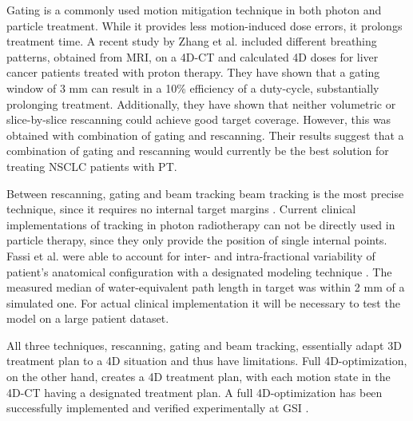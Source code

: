 \documentclass[type=dr, dr=rernat, accentcolor=tud7b,colorbacktitle, bigchapter, openright, twoside, 12pt ]{tudthesis}
\begin{document}

Gating is a commonly used motion mitigation technique in both photon and particle treatment. While it provides less motion-induced dose errors, it prolongs treatment time.
A recent study by Zhang et al. \cite{Zhang2015} included 
different breathing patterns, obtained from MRI, on a 4D-CT and calculated 4D doses for liver cancer patients treated with proton therapy. They have shown that a gating window of 3 mm can result
in a 10\% efficiency of a duty-cycle, 
substantially prolonging treatment. Additionally, they have shown that neither volumetric or slice-by-slice rescanning could achieve good target coverage.
However, this was obtained with combination
of gating and rescanning. Their results suggest that a combination of gating and rescanning would currently be the best solution for treating NSCLC patients with PT.

Between rescanning, gating and beam tracking beam tracking is the most precise technique, since it requires no internal target margins \cite{Bert2011}. 
Current clinical implementations of tracking in photon radiotherapy \cite{Kilby2010, Keall2014} can not be directly used in particle therapy, 
since they only provide the position of single internal points. Fassi et al. 
\cite{Fassi2015} were able to account for inter- and intra-fractional variability of patient's anatomical configuration with a designated modeling technique \cite{Fassi2014}.
The measured median of water-equivalent path length in target was within 2 mm of a simulated one. For actual clinical implementation it will be necessary to test the model
on a large patient dataset.

All three techniques, rescanning, gating and beam tracking, essentially adapt 3D treatment plan to a 4D situation and thus have limitations. Full 4D-optimization, on the other hand,
creates a 4D treatment plan, with each motion state in the 4D-CT having a designated treatment plan. A full 4D-optimization has been successfully implemented and verified experimentally at
GSI \cite{Graeff2013}.
\end{document}
